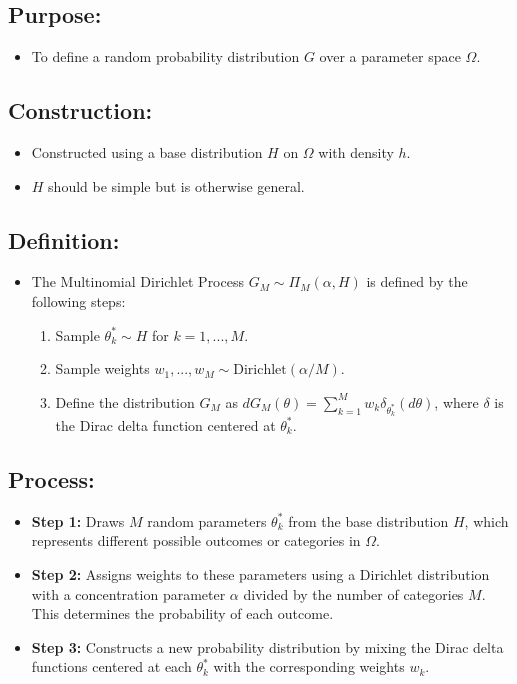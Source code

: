 \documentclass[10pt]{article}
\begin{document}
\subsection*{Purpose:}

\begin{itemize}
  \item To define a random probability distribution \( G \) over a parameter space \( \Omega \).
\end{itemize}

\subsection*{Construction:}

\begin{itemize}
  \item Constructed using a base distribution \( H \) on \( \Omega \) with density \( h \).
  \item \( H \) should be simple but is otherwise general.
\end{itemize}

\subsection*{Definition:}

\begin{itemize}
  \item The Multinomial Dirichlet Process \( G_M \sim \Pi_M(\alpha, H) \) is defined by the following steps:
  \begin{enumerate}
    \item Sample \( \theta_k^* \sim H \) for \( k = 1, ..., M \).
    \item Sample weights \( w_1, ..., w_M \sim \text{Dirichlet}(\alpha/M) \).
    \item Define the distribution \( G_M \) as \( dG_M(\theta) = \sum_{k=1}^M w_k \delta_{\theta_k^*}(d\theta) \), where \( \delta \) is the Dirac delta function centered at \( \theta_k^* \).
  \end{enumerate}
\end{itemize}

\subsection*{Process:}

\begin{itemize}
  \item \textbf{Step 1:} Draws \( M \) random parameters \( \theta_k^* \) from the base distribution \( H \), which represents different possible outcomes or categories in \( \Omega \).
  \item \textbf{Step 2:} Assigns weights to these parameters using a Dirichlet distribution with a concentration parameter \( \alpha \) divided by the number of categories \( M \). This determines the probability of each outcome.
  \item \textbf{Step 3:} Constructs a new probability distribution by mixing the Dirac delta functions centered at each \( \theta_k^* \) with the corresponding weights \( w_k \).
\end{itemize}
\end{document}
